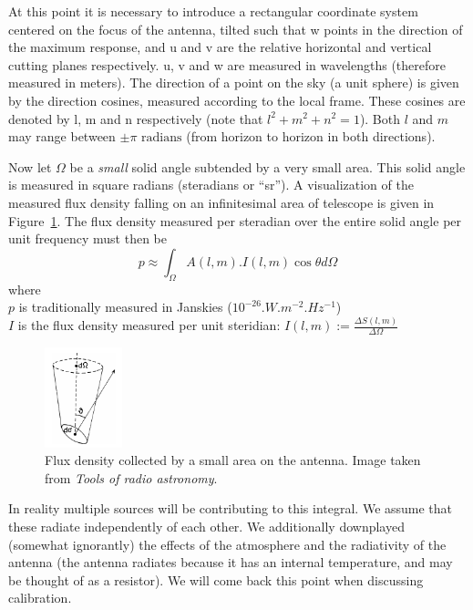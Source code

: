 \documentclass[a4paper,10pt]{report}
\begin{document}
At this point it is necessary to introduce a rectangular coordinate system centered on the focus of the antenna, tilted such that w points 
in the direction of the maximum response, and u and v are the relative horizontal and vertical cutting planes respectively. u, v and w are 
measured in wavelengths (therefore measured in meters). The direction of a point on the sky (a unit sphere) is given by the 
direction cosines, measured according to the local frame. These cosines are denoted by l, m and n respectively (note that $l^2 + m^2 + n^2 = 1$). 
Both $l$ and $m$ may range between $\pm\pi \text{ radians}$ (from horizon to horizon in both directions).

Now let $\Omega$ be a \textit{small} solid angle subtended by a very small area. This solid angle is measured in square radians (steradians or ``sr''). A visualization of the measured flux density
falling on an infinitesimal area of telescope is given in Figure~\ref{fig_measuring_source_brightness}. The flux density measured 
per steradian over the entire solid angle per unit frequency must then be 
  \begin{equation}
    p \approx \int_{\Omega}{A(l,m).I(l,m)\cos{\theta}d\Omega}
  \end{equation}
where\\
  $p$ is traditionally measured in Janskies ($10^{-26}.W.m^{-2}.Hz^{-1}$)\\
  $I$ is the flux density measured per unit steridian: $I(l,m) := \frac{\Delta S(l,m)}{\Delta\Omega}$\\
\begin{figure}[ht]
\begin{mdframed}
 \centering
 \includegraphics[width=0.2\textwidth]{images/measuring_source_brightness.png}
 \caption[Source brightness]{Flux density collected by a small area on the antenna. Image taken from \textit{Tools of radio astronomy}\cite{wilson2009tools}.}
 \label{fig_measuring_source_brightness}
\end{mdframed}
\end{figure}

In reality multiple sources will be contributing to this integral. We assume that these radiate independently of each other. We additionally
downplayed (somewhat ignorantly) the effects of the atmosphere and the radiativity of the antenna (the antenna radiates because it has an internal temperature, 
and may be thought of as a resistor). We will come back this point when discussing calibration.
\end{document}
